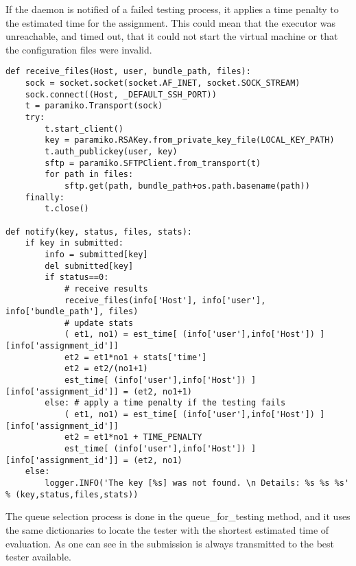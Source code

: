If the daemon is notified of a failed testing process, it applies a time
penalty to the estimated time for the assignment. This could mean that 
the executor was unreachable, and timed out, that it could not start
the virtual machine or that the configuration files were invalid.

\lstset{caption=Notification process, language=python, label=lst:daemon-notify}
\begin{lstlisting}
def receive_files(Host, user, bundle_path, files):
    sock = socket.socket(socket.AF_INET, socket.SOCK_STREAM)
    sock.connect((Host, _DEFAULT_SSH_PORT))
    t = paramiko.Transport(sock)
    try:
        t.start_client()
        key = paramiko.RSAKey.from_private_key_file(LOCAL_KEY_PATH)
        t.auth_publickey(user, key)
        sftp = paramiko.SFTPClient.from_transport(t)
        for path in files:
            sftp.get(path, bundle_path+os.path.basename(path))
    finally:
        t.close()
    
def notify(key, status, files, stats):
    if key in submitted:
        info = submitted[key]
        del submitted[key]
        if status==0:
            # receive results
            receive_files(info['Host'], info['user'], info['bundle_path'], files) 
            # update stats
            ( et1, no1) = est_time[ (info['user'],info['Host']) ][info['assignment_id']]
            et2 = et1*no1 + stats['time']
            et2 = et2/(no1+1)
            est_time[ (info['user'],info['Host']) ][info['assignment_id']] = (et2, no1+1)       
        else: # apply a time penalty if the testing fails
            ( et1, no1) = est_time[ (info['user'],info['Host']) ][info['assignment_id']]
            et2 = et1*no1 + TIME_PENALTY
            est_time[ (info['user'],info['Host']) ][info['assignment_id']] = (et2, no1)
    else:
        logger.INFO('The key [%s] was not found. \n Details: %s %s %s' % (key,status,files,stats))
\end{lstlisting}

The queue selection process is done in the queue_for_testing method, and it uses
the same dictionaries to locate the tester with the shortest estimated time
of evaluation. As one can see in  
the submission is always transmitted to the best tester available.

\begin{center}
\end{center}

